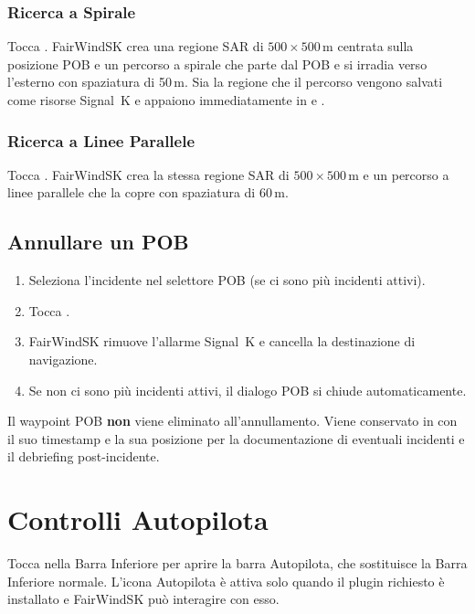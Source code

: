 \subsection{Ricerca a Spirale}

Tocca .
FairWindSK crea una regione SAR di $500 \times 500$\,m centrata sulla posizione POB
e un percorso a spirale che parte dal POB e si irradia verso l'esterno con spaziatura di 50\,m.
Sia la regione che il percorso vengono salvati come risorse Signal~K e appaiono immediatamente
in  e .

\subsection{Ricerca a Linee Parallele}

Tocca .
FairWindSK crea la stessa regione SAR di $500 \times 500$\,m e un percorso a linee
parallele che la copre con spaziatura di 60\,m.

\section{Annullare un POB}

\begin{enumerate}
  \item Seleziona l'incidente nel selettore POB (se ci sono più incidenti attivi).
  \item Tocca .
  \item FairWindSK rimuove l'allarme Signal~K e cancella la destinazione di navigazione.
  \item Se non ci sono più incidenti attivi, il dialogo POB si chiude automaticamente.
\end{enumerate}

\begin{notebox}
Il waypoint POB \textbf{non} viene eliminato all'annullamento.
Viene conservato in  con il suo timestamp e la sua posizione
per la documentazione di eventuali incidenti e il debriefing post-incidente.
\end{notebox}

\chapter{Controlli Autopilota}
\label{ch:autopilota}

Tocca  nella Barra Inferiore per aprire la barra
Autopilota, che sostituisce la Barra Inferiore normale.
L'icona Autopilota è attiva solo quando il plugin richiesto è installato e FairWindSK
può interagire con esso.

